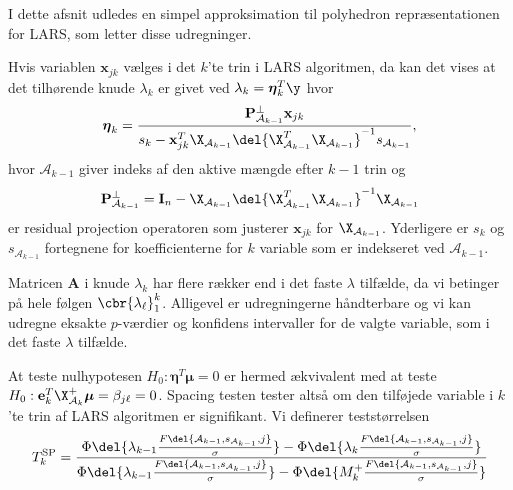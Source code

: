 I dette afsnit udledes en simpel approksimation til polyhedron repræsentationen for LARS, som letter disse udregninger. 





Hvis variablen \(\mathbf{x}_{jk}\) vælges i det \(k\)'te trin i LARS algoritmen, da kan det vises at det tilhørende knude \(\lambda_k\) er givet ved \(\lambda_k = \boldsymbol{\eta}_k^T \y\) hvor
\begin{align*}
\boldsymbol{\eta}_k = \frac{\mathbf{P}^\perp_{\mathcal{A}_{k-1}} \mathbf{x}_{jk}}{s_k - \mathbf{x}_{jk}^T \X_{\mathcal{A}_{k-1}} \del{\X_{\mathcal{A}_{k-1}}^T \X_{\mathcal{A}_{k-1}}}^{-1} s_{\mathcal{A}_{k-1}}},
\end{align*}
hvor \(\mathcal{A}_{k-1}\) giver indeks af den aktive mængde efter \(k-1\) trin og
\begin{align*}
\mathbf{P}^\perp_{\mathcal{A}_{k-1}} = \mathbf{I}_n - \X_{\mathcal{A}_{k-1}} \del{\X_{\mathcal{A}_{k-1}}^T \X_{\mathcal{A}_{k-1}}}^{-1} \X _{\mathcal{A}_{k-1}}
\end{align*}
er residual projection operatoren som justerer \(\mathbf{x}_{jk}\) for \(\X_{\mathcal{A}_{k-1}}\).
Yderligere er \(s_k\) og \(s_{\mathcal{A}_{k-1}}\) fortegnene for koefficienterne for \(k\) variable som er indekseret ved \(\mathcal{A}_{k-1}\).

Matricen \(\mathbf{A}\) i knude \(\lambda_k\) har flere rækker end i det faste \(\lambda\) tilfælde, da vi betinger på hele følgen \(\cbr{\lambda_\ell}_1^k\).
Alligevel er udregningerne håndterbare og vi kan udregne eksakte \(p\)-værdier og konfidens intervaller for de valgte variable, som i det faste \(\lambda\) tilfælde.



At teste nulhypotesen \(H_0: \boldsymbol{\eta}^T \boldsymbol{\mu} =0\) er hermed ækvivalent med at teste \(H_0: \mathbf{e}_k^T \X_{\mathcal{A}_k}^+ \boldsymbol{\mu}=\beta_{j \ell}=0\).
Spacing testen tester altså om den tilføjede variable i \(k\)'te trin af LARS algoritmen er signifikant.
Vi definerer teststørrelsen
\begin{align*}
T_k^{\text{SP}}= \frac{\Phi \del{\lambda_{k-1} \frac{F \del{\mathcal{A}_{k-1}, s_{\mathcal{A}_{k-1}}, j}}{\sigma}} - \Phi \del{\lambda_{k} \frac{F \del{\mathcal{A}_{k-1}, s_{\mathcal{A}_{k-1}}, j}}{\sigma}}}{\Phi \del{\lambda_{k-1} \frac{F \del{\mathcal{A}_{k-1}, s_{\mathcal{A}_{k-1}}, j}}{\sigma}} - \Phi \del{M_{k}^+ \frac{F \del{\mathcal{A}_{k-1}, s_{\mathcal{A}_{k-1}}, j}}{\sigma}}}
\end{align*}


